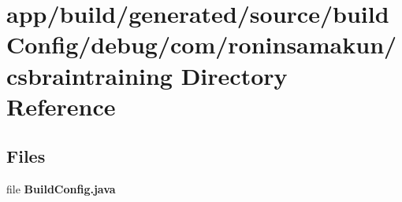 \section{app/build/generated/source/build\+Config/debug/com/roninsamakun/csbraintraining Directory Reference}
\label{dir_482b3bb6d99f2102283e52c311b7b1c7}
\subsection*{Files}
\begin{DoxyCompactItemize}
\item 
file {\bfseries Build\+Config.\+java}
\end{DoxyCompactItemize}
